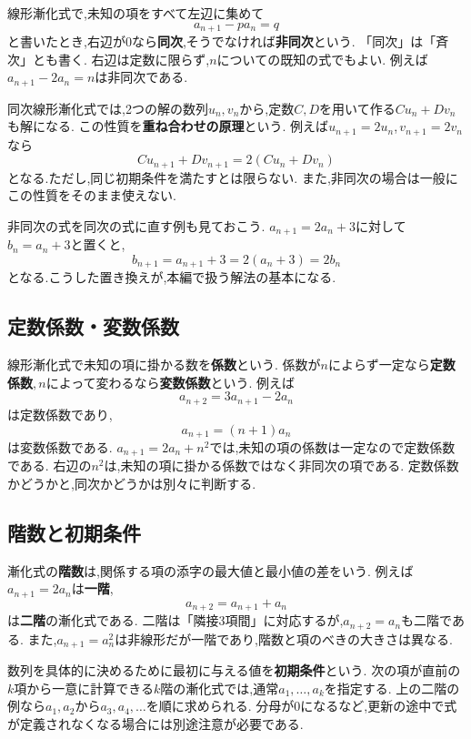     線形漸化式で,未知の項をすべて左辺に集めて
    \[
      a_{n+1}-pa_n=q
    \]
    と書いたとき,右辺が$0$なら\textbf{同次},そうでなければ\textbf{非同次}という.
    「同次」は「斉次」とも書く.
    右辺は定数に限らず,$n$についての既知の式でもよい.
    例えば$a_{n+1}-2a_n=n$は非同次である.

    同次線形漸化式では,2つの解の数列$u_n,v_n$から,定数$C,D$を用いて作る$Cu_n+Dv_n$も解になる.
    この性質を\textbf{重ね合わせの原理}という.
    例えば$u_{n+1}=2u_n$,\,$v_{n+1}=2v_n$なら
    \[
      Cu_{n+1}+Dv_{n+1}=2(Cu_n+Dv_n)
    \]
    となる.ただし,同じ初期条件を満たすとは限らない.
    また,非同次の場合は一般にこの性質をそのまま使えない.

    非同次の式を同次の式に直す例も見ておこう.
    $a_{n+1}=2a_n+3$に対して$b_n=a_n+3$と置くと,
    \[
      b_{n+1}=a_{n+1}+3=2(a_n+3)=2b_n
    \]
    となる.こうした置き換えが,本編で扱う解法の基本になる.

  \subsection{定数係数・変数係数}\label{節：用語解説：定数係数・変数係数}
    線形漸化式で未知の項に掛かる数を\textbf{係数}という.
    係数が$n$によらず一定なら\textbf{定数係数},\,$n$によって変わるなら\textbf{変数係数}という.
    例えば
    \[
      a_{n+2}=3a_{n+1}-2a_n
    \]
    は定数係数であり,
    \[
      a_{n+1}=(n+1)a_n
    \]
    は変数係数である.
    $a_{n+1}=2a_n+n^2$では,未知の項の係数は一定なので定数係数である.
    右辺の$n^2$は,未知の項に掛かる係数ではなく非同次の項である.
    定数係数かどうかと,同次かどうかは別々に判断する.

  \subsection{階数と初期条件}\label{節：用語解説：階数と初期条件}
    漸化式の\textbf{階数}は,関係する項の添字の最大値と最小値の差をいう.
    例えば$a_{n+1}=2a_n$は\textbf{一階},
    \[
      a_{n+2}=a_{n+1}+a_n
    \]
    は\textbf{二階}の漸化式である.
    二階は「隣接3項間」に対応するが,$a_{n+2}=a_n$も二階である.
    また,$a_{n+1}=a_n^2$は非線形だが一階であり,階数と項のべきの大きさは異なる.

    数列を具体的に決めるために最初に与える値を\textbf{初期条件}という.
    次の項が直前の$k$項から一意に計算できる$k$階の漸化式では,通常$a_1,\ldots,a_k$を指定する.
    上の二階の例なら$a_1,a_2$から$a_3,a_4,\ldots$を順に求められる.
    分母が$0$になるなど,更新の途中で式が定義されなくなる場合には別途注意が必要である.

